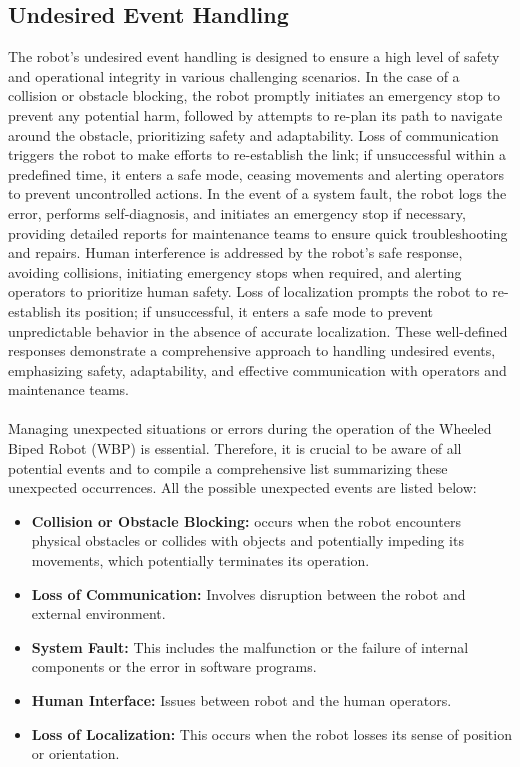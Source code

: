 \documentclass[12pt]{article}
\begin{document}
    \subsection{Undesired Event Handling}
        The robot's undesired event handling is designed to ensure a high level of safety and operational integrity in various challenging scenarios. In the case of a collision or obstacle blocking, the robot promptly initiates an emergency stop to prevent any potential harm, followed by attempts to re-plan its path to navigate around the obstacle, prioritizing safety and adaptability. Loss of communication triggers the robot to make efforts to re-establish the link; if unsuccessful within a predefined time, it enters a safe mode, ceasing movements and alerting operators to prevent uncontrolled actions. In the event of a system fault, the robot logs the error, performs self-diagnosis, and initiates an emergency stop if necessary, providing detailed reports for maintenance teams to ensure quick troubleshooting and repairs. Human interference is addressed by the robot's safe response, avoiding collisions, initiating emergency stops when required, and alerting operators to prioritize human safety. Loss of localization prompts the robot to re-establish its position; if unsuccessful, it enters a safe mode to prevent unpredictable behavior in the absence of accurate localization. These well-defined responses demonstrate a comprehensive approach to handling undesired events, emphasizing safety, adaptability, and effective communication with operators and maintenance teams.\\\\
          Managing unexpected situations or errors during the operation of the Wheeled Biped Robot (WBP) is essential. Therefore, it is crucial to be aware of all potential events and to compile a comprehensive list summarizing these unexpected occurrences. All the possible unexpected events are listed below:
          \begin{itemize}
          \item \textbf{Collision or Obstacle Blocking:} occurs when the robot encounters physical obstacles or collides with objects and potentially impeding its movements, which potentially terminates its operation.
          \item  \textbf{Loss of Communication:} Involves disruption between the robot and external environment.
          \item  \textbf{System Fault:} This includes the malfunction or the failure of internal components or the error in software programs. 
          \item  \textbf{Human Interface:} Issues between robot and the human operators.
          \item  \textbf{Loss of Localization:} This occurs when the robot losses its sense of position or orientation.

          \end{itemize}        
\end{document}
